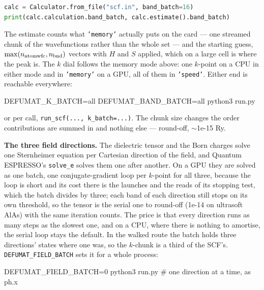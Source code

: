 \documentclass[11pt,a4paper]{article}
\newcommand{\qe}{Quantum ESPRESSO}
\newcommand{\code}[1]{\texttt{\small #1}}
\begin{document}
\begin{lstlisting}[language=Python]
calc = Calculator.from_file("scf.in", band_batch=16)
print(calc.calculation.band_batch, calc.estimate().band_batch)
\end{lstlisting}

\noindent The estimate counts what \code{'memory'} actually puts on the card ---
one streamed chunk of the wavefunctions rather than the whole set --- and the
starting guess, $\max(n_{\rm atomwfc}, n_{\rm bnd})$ vectors with $H$ and $S$
applied, which on a large cell is where the peak is. The $k$ dial follows the memory mode above: one $k$-point on a CPU in
either mode and in \code{'memory'} on a GPU, all of them in \code{'speed'}.
Either end is reachable everywhere:

\begin{shcode}
DEFUMAT_K_BATCH=all DEFUMAT_BAND_BATCH=all python3 run.py
\end{shcode}

or per call, \code{run\_scf(..., k\_batch=...)}. The chunk size changes the order
contributions are summed in and nothing else --- round-off, $\sim$1e-15 Ry.

\textbf{The three field directions.} The dielectric tensor and the Born charges
solve one Sternheimer equation per Cartesian direction of the field, and
\qe's \code{solve\_e} solves them one after another. On a GPU they are solved as
one batch, one conjugate-gradient loop per $k$-point for all three, because the
loop is short and its cost there is the launches and the reads of its stopping
test, which the batch divides by three; each band of each direction still stops
on its own threshold, so the tensor is the serial one to round-off (1e-14 on
ultrasoft AlAs) with the same iteration counts. The price is that every direction
runs as many steps as the slowest one, and on a CPU, where there is nothing to
amortise, the serial loop stays the default. In the walked route the batch holds
three directions' states where one was, so the $k$-chunk is a third of the SCF's.
\code{DEFUMAT\_FIELD\_BATCH} sets it for a whole process:

\begin{shcode}
DEFUMAT_FIELD_BATCH=0 python3 run.py    # one direction at a time, as ph.x
\end{shcode}
\end{document}
